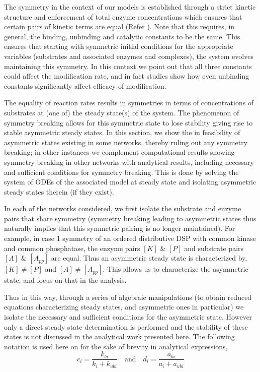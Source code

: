 \documentclass[9pt,lineno]{elife}
\begin{document}
\begin{appendixbox}
The symmetry in the context of our models is established through a strict kinetic structure and enforcement of total enzyme concentrations which ensures that certain pairs of kinetic terms are  equal (Refer ). Note that this requires, in general, the binding, unbinding and catalytic constants to be the same. This ensures that starting with symmetric initial conditions for the appropriate variables (substrates and associated enzymes and complexes), the system evolves maintaining this symmetry. In this context we point out that all three constants could affect the modification rate, and in fact studies \cite{Hatakeyama2014, Hatakeyama2020} show how even unbinding constants significantly affect efficacy of modification.

The equality of reaction rates results in symmetries in terms of concentrations of substrates at (one of) the steady state(s) of the system. The phenomenon of symmetry breaking allows for this symmetric state to lose stability giving rise to stable asymmetric steady states. In this section, we show the in feasibility of asymmetric states existing in some networks, thereby ruling out any symmetry breaking; in other instances we complement computational results showing symmetry breaking in other networks with analytical results, including necessary and sufficient conditions for symmetry breaking. This is done by solving the  system of ODEs of the associated model at steady state and isolating asymmetric steady states therein (if they exist).

In each of the networks considered, we first isolate the substrate and enzyme pairs that share symmetry (symmetry breaking leading to asymmetric states thus naturally implies that this symmetric pairing is no longer maintained). For example, in case 1 symmetry of an ordered distributive DSP with common kinase and common phosphatase, the enzyme pairs $[K]$ \& $[P]$ and substrate pairs $[A]$ \& $[A_{pp}]$ are equal. Thus an asymmetric steady state is characterized by,  $[K] \neq [P]$ and $[A] \neq [A_{pp}]$. 
This allows us to characterize the asymmetric state, and focus on that in the analysis.

Thus in this way, through a series of algebraic manipulations (to
obtain reduced equations characterizing steady states, and asymmetric ones in particular) we isolate the necessary and sufficient conditions for the asymmetric state. However only a direct steady state determination is performed and the stability of these states is not discussed in the analytical work presented here. The following notation is used here on for the sake of brevity in analytical expressions, $$c_i = \frac{k_{bi}}{k_i+k_{ubi}} \quad \textrm{and} \quad d_i = \frac{a_{bi}}{a_i+a_{ubi}}$$


\end{appendixbox}
\end{document}
